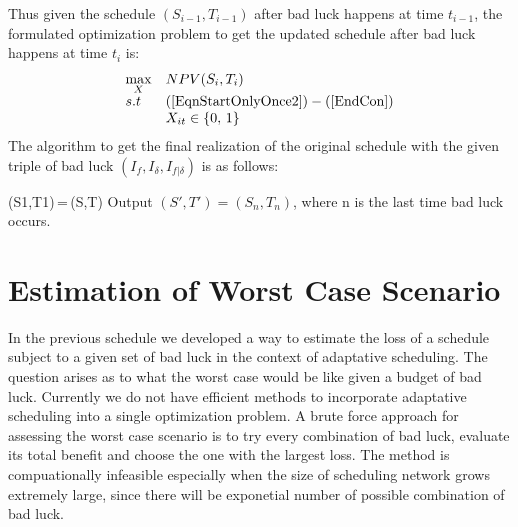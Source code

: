 \documentclass[final,3p,times]{elsarticle}
\begin{document}
Thus given the schedule $(S_{i-1},T_{i-1})$ after bad luck happens at time $t_{i-1}$, the formulated optimization problem to get the updated schedule after bad luck happens at time $t_i$ is:
\begin{equation}\label{UpdateOpt}
\begin{array}{ll}
\max\limits_{X} &NPV(S_i,T_i)\\
s.t &(\ref{EqnStartOnlyOnce2}) -(\ref{EndCon})\\
    & X_{it} \in \{0,\,1\}
\end{array}
\end{equation}
The algorithm to get the final realization of the original schedule with the given triple of bad luck $(I_f, I_{\delta}, I_{f|\delta})$ is as follows:\\
\begin{algorithm}[H]
(S1,T1)\,=\,(S,T)\;
Output $(S',T')=(S_n,T_n)$, where n is the last time bad luck occurs.
\end{algorithm}

\section{Estimation of Worst Case Scenario}
In the previous schedule we developed a way to estimate the loss of a schedule subject to a given set of bad luck in the context of adaptative scheduling. The question arises as to what the worst case would be like given a budget of bad luck. Currently we do not have efficient methods to incorporate adaptative scheduling into a single optimization problem. A brute force approach for assessing the worst case scenario is to try every combination of bad luck, evaluate its total benefit and choose the one with the largest loss. The method is compuationally infeasible especially when the size of scheduling network grows extremely large, since there will be exponetial number of possible combination of bad luck. 
\end{document}

